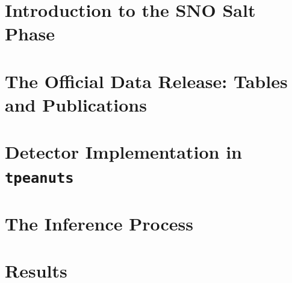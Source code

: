 \documentclass[11pt,a4paper,openany]{report}
\begin{document}
\tableofcontents
{}
\clearpage
{}

\chapter{Introduction to the SNO Salt Phase}


\chapter{The Official Data Release: Tables and Publications}


\chapter{Detector Implementation in \texttt{tpeanuts}}


\chapter{The Inference Process}


\chapter{Results}


\clearpage
\printbibliography[title={References}]
\end{document}
